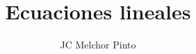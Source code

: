 \documentclass[12pt,addpoints,answers]{guia}
\title{Ecuaciones lineales}
\author{JC Melchor Pinto}
\begin{document}
\INFO%
\begin{questions}
    \question
\end{questions}
\end{document}
